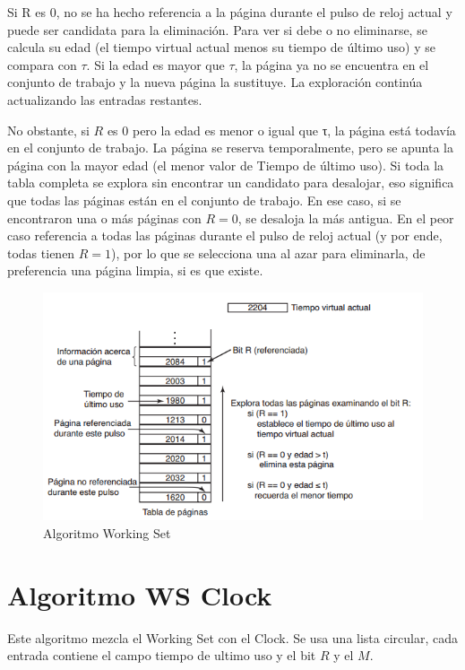 \documentclass{article}
\begin{document}
Si R es 0, no se ha hecho referencia a la página durante el pulso de reloj actual y puede ser candidata para la eliminación. Para ver si debe o no eliminarse, se calcula su edad (el tiempo virtual
actual menos su tiempo de último uso) y se compara con $\tau$. Si la edad es mayor que $\tau$, la página ya no se encuentra en el conjunto de trabajo y la nueva página la sustituye. La exploración continúa actualizando las entradas restantes.

No obstante, si $R$ es 0 pero la edad es menor o igual que τ, la página está todavía en el conjunto de trabajo. La página se reserva temporalmente, pero se apunta la página con la mayor edad (el menor valor de Tiempo de último uso). Si toda la tabla completa se explora sin encontrar un candidato para desalojar, eso significa que todas las páginas están en el conjunto de trabajo. En ese caso, si se encontraron una o más páginas con $R = 0$, se desaloja la más antigua. En el peor caso referencia a todas las páginas durante el pulso de reloj actual (y por ende, todas tienen $R = 1$), por lo que se selecciona una al azar para eliminarla, de preferencia una página limpia, si es que existe.

\begin{figure}[H]
	\centering
	\includegraphics[scale=0.7]{img/workingset.png}
	\caption{Algoritmo Working Set}
\end{figure}


{\centering \section*{Algoritmo WS Clock}}
Este algoritmo mezcla el Working Set con el Clock. Se usa una lista circular, cada entrada contiene el campo tiempo de ultimo uso y el bit $R$ y el $M$.
\end{document}
